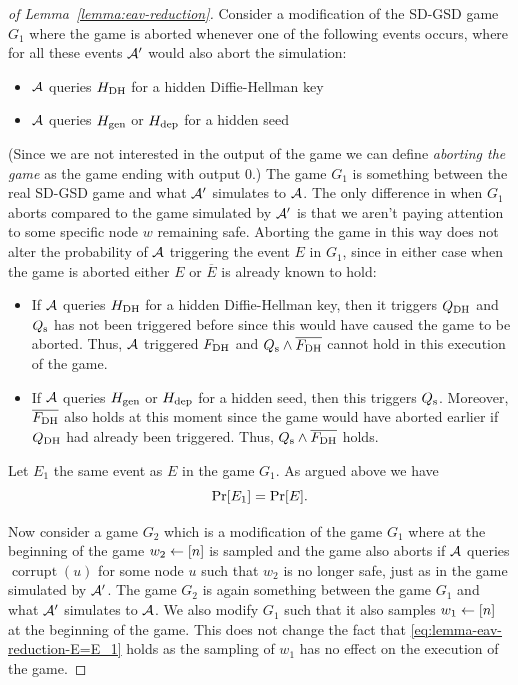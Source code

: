 \begin{proof}[of Lemma~\ref{lemma:eav-reduction}]
	Consider a modification of the SD-GSD game $G_1$ where the game is aborted whenever one of the following events occurs, where for all these events $\mathcal{A}'$ would also abort the simulation:
	\begin{itemize}
		\item $\mathcal{A}$ queries $H_\mathrm{DH}$ for a hidden Diffie-Hellman key
		\item $\mathcal{A}$ queries $H_\mathrm{gen}$ or $H_\mathrm{dep}$ for a hidden seed
	\end{itemize}
	(Since we are not interested in the output of the game we can define \emph{aborting the game} as the game ending with output 0.) The game $G_1$ is something between the real SD-GSD game and what $\mathcal{A}'$ simulates to $\mathcal{A}$. The only difference in when $G_1$ aborts compared to the game simulated by $\mathcal{A}'$ is that we aren't paying attention to some specific node $w$ remaining safe. Aborting the game in this way does not alter the probability of $\mathcal{A}$ triggering the event $E$ in $G_1$, since in either case when the game is aborted either $E$ or $\overline{E}$ is already known to hold:
	\begin{itemize}
		\item If $\mathcal{A}$ queries $H_\mathrm{DH}$ for a hidden Diffie-Hellman key, then it triggers $Q_\mathrm{DH}$ and $Q_\mathrm{s}$ has not been triggered before since this would have caused the game to be aborted. Thus, $\mathcal{A}$ triggered $F_\mathrm{DH}$ and $Q_\mathrm{s} \land \overline{F_\mathrm{DH}}$ cannot hold in this execution of the game.
		\item If $\mathcal{A}$ queries $H_\mathrm{gen}$ or $H_\mathrm{dep}$ for a hidden seed, then this triggers $Q_\mathrm{s}$. Moreover, $\overline{F_\mathrm{DH}}$ also holds at this moment since the game would have aborted earlier if $Q_\mathrm{DH}$ had already been triggered. Thus, $Q_\mathrm{s} \land \overline{F_\mathrm{DH}}$ holds.
	\end{itemize}
	Let $E_1$ the same event as $E$ in the game $G_1$. As argued above we have
	\begin{equation} \label{eq:lemma-eav-reduction-E=E_1}
		\pr{E_1} = \pr{E}.
	\end{equation}


	Now consider a game $G_2$ which is a modification of the game $G_1$ where at the beginning of the game $w_2 \leftarrow [n]$ is sampled and the game also aborts if $\mathcal{A}$ queries $\operatorname{corrupt}(u)$ for some node $u$ such that $w_2$ is no longer safe, just as in the game simulated by $\mathcal{A}'$. The game $G_2$ is again something between the game $G_1$ and what $\mathcal{A}'$ simulates to $\mathcal{A}$. We also modify $G_1$ such that it also samples $w_1 \leftarrow [n]$ at the beginning of the game. This does not change the fact that \eqref{eq:lemma-eav-reduction-E=E_1} holds as the sampling of $w_1$ has no effect on the execution of the game.


\end{proof}
